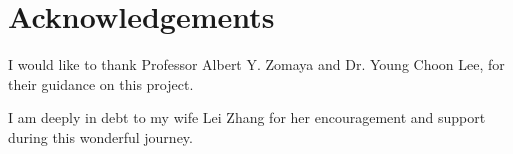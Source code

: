 \chapter*{Acknowledgements}

I would like to thank Professor Albert Y. Zomaya and Dr. Young Choon Lee, for their guidance on this project.

I am deeply in debt to my wife Lei Zhang for her encouragement and support during this wonderful journey. 